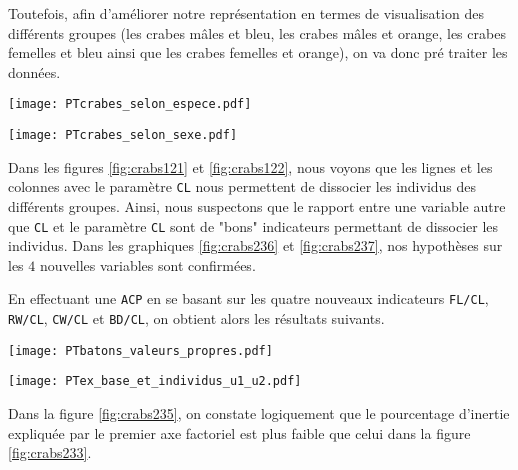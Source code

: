 \documentclass{article}
\begin{document}
\begin{multicols}{2}
Toutefois, afin d'améliorer notre représentation en termes de visualisation des différents groupes (les crabes mâles et bleu, les crabes mâles et orange, les crabes femelles et bleu ainsi que les crabes femelles et orange), on va donc pré traiter les données.

\begingroup
    \centering
   \texttt{[image: PTcrabes\_selon\_espece.pdf]}
    \label{fig:crabs236}
\endgroup

\begingroup
    \centering
   \texttt{[image: PTcrabes\_selon\_sexe.pdf]}
    \label{fig:crabs237}
\endgroup

Dans les figures \ref{fig:crabs121} et \ref{fig:crabs122}, nous voyons que les lignes et les colonnes avec le paramètre \texttt{CL} nous permettent de dissocier les individus des différents groupes. Ainsi, nous suspectons que le rapport entre une variable autre que \texttt{CL} et le paramètre \texttt{CL} sont de "bons" indicateurs permettant de dissocier les individus. Dans les graphiques \ref{fig:crabs236} et \ref{fig:crabs237}, nos hypothèses sur les $4$ nouvelles variables sont confirmées.

En effectuant une \texttt{ACP} en se basant sur les quatre nouveaux indicateurs \texttt{FL/CL}, \texttt{RW/CL}, \texttt{CW/CL} et \texttt{BD/CL}, on obtient alors les résultats suivants. 

\begingroup
    \centering
   \texttt{[image: PTbatons\_valeurs\_propres.pdf]}
    \label{fig:crabs235}
\endgroup

\begingroup
    \centering
   \texttt{[image: PTex\_base\_et\_individus\_u1\_u2.pdf]}
    \label{fig:crabs234}
\endgroup

Dans la figure \ref{fig:crabs235}, on constate logiquement que le pourcentage d'inertie expliquée par le premier axe factoriel est plus faible que celui dans la figure \ref{fig:crabs233}.


\end{multicols}
\end{document}
